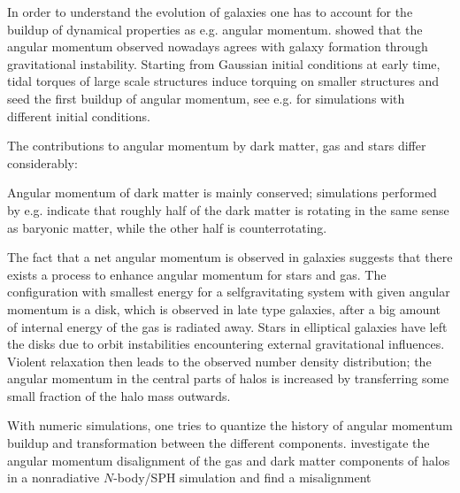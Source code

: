 \documentclass[a4paper,10pt]{paper}
\begin{document}
%
In order to understand the evolution of galaxies one has to account for the
buildup of dynamical properties as e.g. angular momentum. \cite{Peebles1969}
showed that the angular momentum observed nowadays agrees with galaxy
formation through gravitational instability. Starting from Gaussian initial
conditions at early time, tidal torques of large scale structures induce
torquing on smaller structures and seed the first buildup of angular momentum,
see e.g. \cite{Barnes1987} for simulations with different initial conditions.

The contributions to angular momentum by dark matter, gas and stars differ
considerably:

Angular momentum of dark matter is mainly conserved; simulations performed by
e.g. \cite{Sharma2005} indicate that roughly half of the dark matter is
rotating in the same sense as baryonic matter, while the other half is
counterrotating.

The fact that a net angular momentum is observed in galaxies suggests that
there exists a process to enhance angular momentum for stars and gas. The
configuration with smallest energy for a selfgravitating system with given
angular momentum is a disk, which is observed in late type galaxies, after a
big amount of internal energy of the gas is radiated away. Stars in elliptical
galaxies have left the disks due to orbit instabilities encountering external
gravitational influences. Violent relaxation then leads to the observed number
density distribution; the angular momentum in the central parts of halos is
increased by transferring some small fraction of the halo mass outwards.

With numeric simulations, one tries to quantize the history of angular
momentum buildup and transformation between the different components.
%
\cite{Sharma2005} investigate the angular momentum disalignment of the gas and
dark matter components of halos in a nonradiative $N$-body/SPH simulation and
find a misalignment
\end{document}
